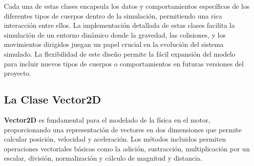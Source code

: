 Cada una de estas clases encapsula los datos y comportamientos específicos de los diferentes tipos de cuerpos dentro de la simulación, permitiendo una rica interacción entre ellos. La implementación detallada de estas clases facilita la simulación de un entorno dinámico donde la gravedad, las colisiones, y los movimientos dirigidos juegan un papel crucial en la evolución del sistema simulado. La flexibilidad de este diseño permite la fácil expansión del modelo para incluir nuevos tipos de cuerpos o comportamientos en futuras versiones del proyecto.
\subsection{La Clase Vector2D}
\textbf{Vector2D} es fundamental para el modelado de la física en el motor, proporcionando una representación de vectores en dos dimensiones que permite calcular posición, velocidad y aceleración. Los métodos incluidos permiten operaciones vectoriales básicas como la adición, sustracción, multiplicación por un escalar, división, normalización y cálculo de magnitud y distancia.

